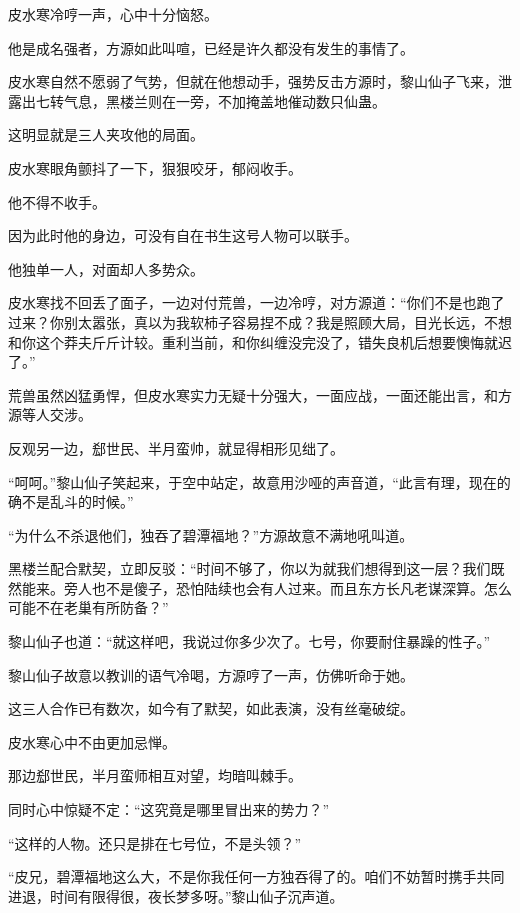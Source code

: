 
\begin{this_body}



皮水寒冷哼一声，心中十分恼怒。

他是成名强者，方源如此叫喧，已经是许久都没有发生的事情了。

皮水寒自然不愿弱了气势，但就在他想动手，强势反击方源时，黎山仙子飞来，泄露出七转气息，黑楼兰则在一旁，不加掩盖地催动数只仙蛊。

这明显就是三人夹攻他的局面。

皮水寒眼角颤抖了一下，狠狠咬牙，郁闷收手。

他不得不收手。

因为此时他的身边，可没有自在书生这号人物可以联手。

他独单一人，对面却人多势众。

皮水寒找不回丢了面子，一边对付荒兽，一边冷哼，对方源道：“你们不是也跑了过来？你别太嚣张，真以为我软柿子容易捏不成？我是照顾大局，目光长远，不想和你这个莽夫斤斤计较。重利当前，和你纠缠没完没了，错失良机后想要懊悔就迟了。”

荒兽虽然凶猛勇悍，但皮水寒实力无疑十分强大，一面应战，一面还能出言，和方源等人交涉。

反观另一边，郄世民、半月蛮帅，就显得相形见绌了。

“呵呵。”黎山仙子笑起来，于空中站定，故意用沙哑的声音道，“此言有理，现在的确不是乱斗的时候。”

“为什么不杀退他们，独吞了碧潭福地？”方源故意不满地吼叫道。

黑楼兰配合默契，立即反驳：“时间不够了，你以为就我们想得到这一层？我们既然能来。旁人也不是傻子，恐怕陆续也会有人过来。而且东方长凡老谋深算。怎么可能不在老巢有所防备？”

黎山仙子也道：“就这样吧，我说过你多少次了。七号，你要耐住暴躁的性子。”

黎山仙子故意以教训的语气冷喝，方源哼了一声，仿佛听命于她。

这三人合作已有数次，如今有了默契，如此表演，没有丝毫破绽。

皮水寒心中不由更加忌惮。

那边郄世民，半月蛮师相互对望，均暗叫棘手。

同时心中惊疑不定：“这究竟是哪里冒出来的势力？”

“这样的人物。还只是排在七号位，不是头领？”

“皮兄，碧潭福地这么大，不是你我任何一方独吞得了的。咱们不妨暂时携手共同进退，时间有限得很，夜长梦多呀。”黎山仙子沉声道。


\end{this_body}
